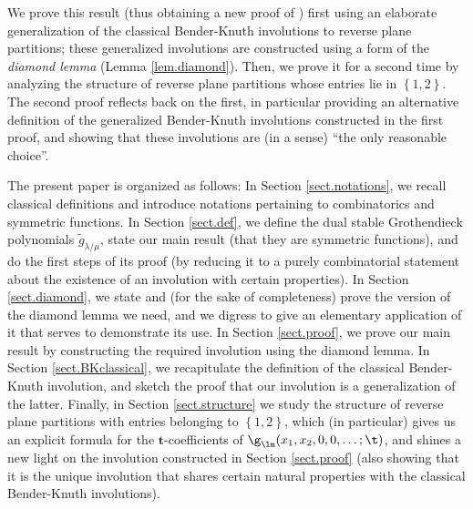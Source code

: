 \documentclass[numbers=enddot,12pt,final,onecolumn,notitlepage]{scrartcl}%
\theoremstyle{definition}
\begin{document}
We prove this result (thus obtaining a new proof of \cite[Theorem 9.1]%
{LamPyl}) first using an elaborate generalization of the classical
Bender-Knuth involutions to reverse plane partitions; these generalized
involutions are constructed using a form of the \textit{diamond lemma} (Lemma
\ref{lem.diamond}).
Then, we prove it for a second time by analyzing the structure of reverse
plane partitions whose entries lie in $\left\{1, 2\right\}$. The second
proof reflects back on the first, in particular providing an
alternative definition of the generalized Bender-Knuth involutions
constructed in the first proof, and showing that these involutions
are (in a sense) ``the only reasonable choice''.

The present paper is organized as follows: In Section \ref{sect.notations}, we
recall classical definitions and introduce notations pertaining to
combinatorics and symmetric functions. In Section \ref{sect.def}, we define
the dual stable Grothendieck polynomials $\widetilde{g}_{\lambda/\mu}$, state
our main result (that they are symmetric functions), and do the first steps of
its proof (by reducing it to a purely combinatorial statement about the
existence of an involution with certain properties). In Section
\ref{sect.diamond}, we state and (for the sake of completeness) prove the
version of the diamond lemma we need, and we digress to give an elementary
application of it that serves to demonstrate its use. In Section
\ref{sect.proof}, we prove our main result by constructing the required
involution using the diamond lemma. In Section \ref{sect.BKclassical}, we
recapitulate the definition of the classical Bender-Knuth involution, and
sketch the proof that our involution is a generalization of the latter.
Finally, in Section \ref{sect.structure} we study the structure of
reverse plane partitions with entries belonging to $\left\{1, 2\right\}$,
which (in particular) gives us an explicit formula for the
$\mathbf{t}$-coefficients of $\g_\lm(x_1,x_2,0,0,\dots;\t)$, and shines
a new light on the involution constructed in Section \ref{sect.proof}
(also showing that it is the unique involution that shares certain natural
properties with the classical Bender-Knuth involutions).
\end{document}
